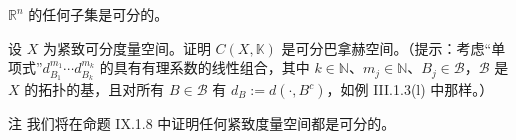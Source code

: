 \begin{exercises}
\begin{items}
\item

$\mathbb{R}^n$ 的任何子集是可分的。

\end{items}

\item

设 $X$ 为紧致可分度量空间。证明 $C(X, \mathbb{K})$ 是可分巴拿赫空间。（提示：考虑“单项式”$d_{B_1}^{m_1} \cdots d_{B_k}^{m_k}$ 的具有有理系数的线性组合，其中 $k \in \mathbb{N}$、$m_j \in \mathbb{N}$、$B_j \in \mathcal{B}$，$\mathcal{B}$ 是 $X$ 的拓扑的基，且对所有 $B \in \mathcal{B}$ 有 $d_B := d(\cdot, B^c)$，如例 III.1.3(l) 中那样。）

注 我们将在命题 IX.1.8 中证明任何紧致度量空间都是可分的。

\end{exercises}
